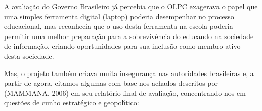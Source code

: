 \documentclass[
12pt,		%
openright,	%
twoside,  %
a4paper,			%
chapter=TITLE,		%
english,			%
french,				%
spanish,			%
brazil				%
]{USPSC-classe/USPSC}
\begin{document}
A avalia\c{c}\~ao do Governo Brasileiro j\'a percebia que o OLPC exagerava o papel que uma simples ferramenta digital (laptop) poderia desempenhar no processo educacional, mas reconhecia que o uso desta ferramenta na escola poderia \textquotedbl permitir uma melhor prepara\c{c}\~ao para a sobreviv\^encia do educando na sociedade de informa\c{c}\~ao, criando oportunidades para sua inclus\~ao como membro ativo desta sociedade\textquotedbl .

















Mas, o projeto tamb\'em criava muita inseguran\c{c}a nas autoridades brasileiras e, a partir de agora, citamos algumas com base nos achados descritos por (MAMMANA, 2006) em seu relat\'orio final de avalia\c{c}\~ao, concentrando-nos em quest\~oes de cunho estrat\'egico e geopol\'{\i}tico:
\end{document}
